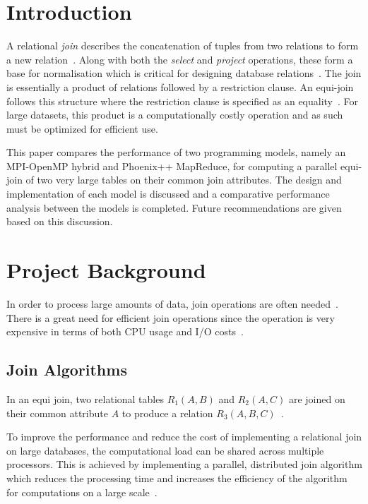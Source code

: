 \documentclass[10pt,twocolumn]{witseiepaper}
\begin{document}
\section{Introduction}

A relational \textit{join} describes the concatenation of tuples from two relations to form a new relation~\cite{stanczyk2001theory}. Along with both the \textit{select} and \textit{project} operations, these form a base for normalisation which is critical for designing database relations~\cite{stanczyk2001theory}. The join is essentially a product of relations followed by a restriction clause. An equi-join follows this structure where the restriction clause is specified as an equality~\cite{stanczyk2001theory}. For large datasets, this product is a computationally costly operation and as such must be optimized for efficient use.

This paper compares the performance of two programming models, namely an MPI-OpenMP hybrid and Phoenix++ MapReduce, for computing a parallel equi-join of two very large tables on their common join attributes. The design and implementation of each model is discussed and a comparative performance analysis between the models is completed. Future recommendations are given based on this discussion.

\section{Project Background}
In order to process large amounts of data, join operations are often needed~\cite{mapReduceJoin}. There is a great need for efficient join operations since the operation is very expensive in terms of both CPU usage and I/O costs~\cite{mapReduceJoin}.

\subsection{Join Algorithms}

In an equi join, two relational tables $R_1(A,B)$ and $R_2(A,C)$ are joined on their common attribute $A$ to produce a relation $R_3(A,B,C)$~\cite{thomas_zurek_optimisation_1997}.

To improve the performance and reduce the cost of implementing a relational join on large databases, the computational load can be shared across multiple processors. This is achieved by implementing a parallel, distributed join algorithm which reduces the processing time and increases the efficiency of the algorithm for computations on a large scale~\cite{thomas_zurek_optimisation_1997}.
\end{document}
